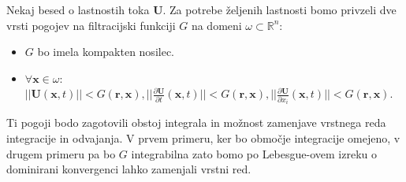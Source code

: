 \documentclass[mat2, tisk]{fmfdelo}
\newcommand{\R}{\mathbb R}
\newcommand{\bd}{\textbf}
\begin{document}
\begin{opomba}
Nekaj besed o lastnostih toka $\bd{U}$. Za potrebe željenih lastnosti
bomo privzeli dve vrsti pogojev na filtracijski funkciji $G$ na domeni $\omega \subset \R^n$:
\hfill
\begin{itemize}
\item $G$ bo imela kompakten nosilec.
\item $\forall \bd{x} \in \omega$: $||\bd{U}(\bd{x}, t)|| < G(\bd{r}, \bd{x}), ||\frac{\partial \bd{U}}{\partial t}(\bd{x}, t)|| < G(\bd{r}, \bd{x}), ||\frac{\partial \bd{U}}{\partial x_i}(\bd{x}, t)|| < G(\bd{r}, \bd{x})$.
\end{itemize}
Ti pogoji bodo zagotovili obstoj integrala in možnost zamenjave vrstnega reda integracije in odvajanja.
V prvem primeru, ker bo območje integracije omejeno, v drugem primeru pa bo 
$G$ integrabilna zato bomo po Lebesgue-ovem izreku o dominirani konvergenci lahko zamenjali vrstni red.
\end{opomba}
\end{document}
